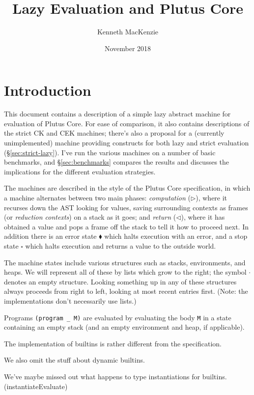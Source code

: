 \documentclass[a4paper]{article}
\author{Kenneth MacKenzie}
\date{November 2018}
\title{Lazy Evaluation and Plutus Core}
\begin{document}
\maketitle
\section{Introduction}
This document contains a description of a simple lazy abstract machine
for evaluation of Plutus Core.  For ease of comparison, it also
contains descriptions of the strict CK and CEK machines; there's also
a proposal for a (currently unimplemented) machine providing
constructs for both lazy and strict evaluation
(\S\ref{sec:strict-lazy}).  I've run the various machines on a
number of basic benchmarks, and \S\ref{sec:benchmarks} compares
the results and discusses the implications for the different
evaluation strategies.

The machines are described in the style of the Plutus Core
specification, in which a machine alternates between two main phases:
\textit{computation} ($\triangleright$), where it recurses down the
AST looking for values, saving surrounding contexts as frames
(or \textit{reduction contexts}) on a stack as it goes; and
\textit{return} ($\triangleleft$), where it has obtained a value and
pops a frame off the stack to tell it how to proceed next.  In
addition there is an error state $\blacklozenge$ which halts execution
with an error, and a stop state $\square$ which halts execution and
returns a value to the outside world.

The machine states include various structures such as stacks,
environments, and heaps.  We will represent all of these by lists
which grow to the right; the symbol $\cdot$ denotes an empty
structure.  Looking something up in any of these structures always
proceeds from right to left, looking at most recent entries first.
(Note: the implementations don't necessarily use lists.)

Programs \texttt{(program \_ M)} are evaluated by evaluating the body
\texttt{M} in a state containing an empty stack (and an empty environment
and heap, if applicable).
 
The implementation of builtins is rather different from the specification.

We also omit the stuff about dynamic builtins.

We've maybe missed out what happens to type instantiations for builtins.
(instantiateEvaluate)
\end{document}
